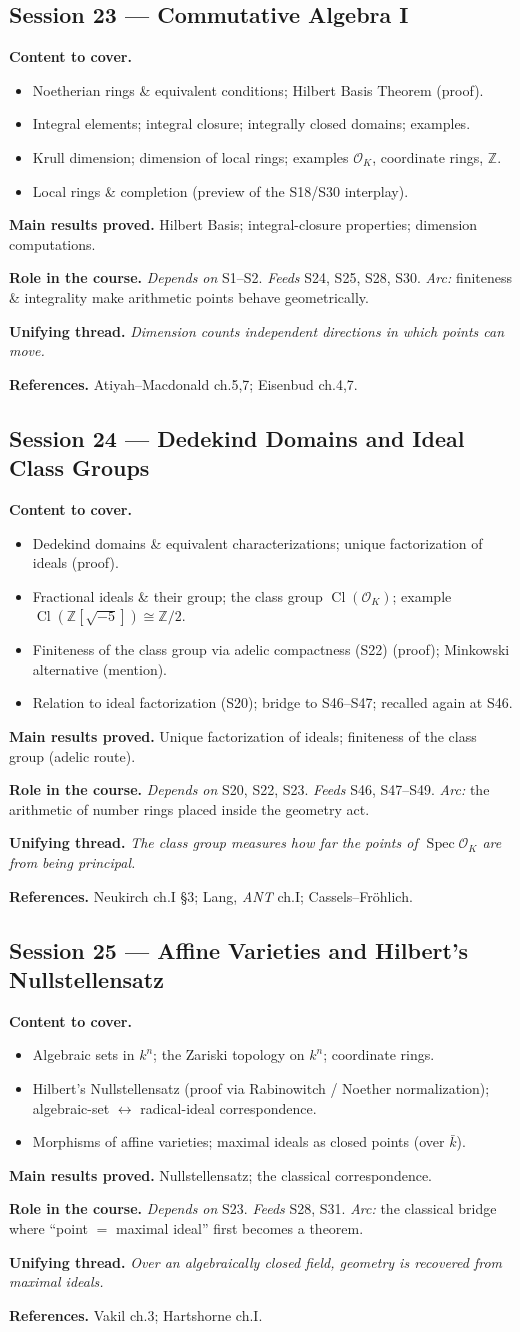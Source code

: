 \documentclass[11pt,a4paper]{article}
\newcommand{\sess}[2]{\subsection[#1. #2]{Session #1 --- #2}}
\newcommand{\chead}{\par\smallskip\noindent\textbf{Content to cover.}}
\newcommand{\proved}[1]{\par\smallskip\noindent\textbf{Main results proved.} #1}
\newcommand{\role}[1]{\par\smallskip\noindent\textbf{Role in the course.} #1}
\newcommand{\thread}[1]{\par\smallskip\noindent\textbf{Unifying thread.} \textit{#1}}
\newcommand{\srefs}[1]{\par\smallskip\noindent\textbf{References.} #1}
\newcommand{\Z}{\mathbb{Z}}
\newcommand{\Spec}{\operatorname{Spec}}
\newcommand{\Cl}{\operatorname{Cl}}
\begin{document}
	\sess{23}{Commutative Algebra I}
	\chead
	\begin{itemize}
		\item Noetherian rings \& equivalent conditions; Hilbert Basis Theorem (proof).
		\item Integral elements; integral closure; integrally closed domains; examples.
		\item Krull dimension; dimension of local rings; examples $\mathcal O_K$, coordinate rings, $\Z$.
		\item Local rings \& completion (preview of the S18/S30 interplay).
	\end{itemize}
	\proved{Hilbert Basis; integral-closure properties; dimension computations.}
	\role{\emph{Depends on} S1--S2. \emph{Feeds} S24, S25, S28, S30. \emph{Arc:} finiteness \& integrality make arithmetic points behave geometrically.}
	\thread{Dimension counts independent directions in which points can move.}
	\srefs{Atiyah--Macdonald ch.5,7; Eisenbud ch.4,7.}
	
	\sess{24}{Dedekind Domains and Ideal Class Groups}
	\chead
	\begin{itemize}
		\item Dedekind domains \& equivalent characterizations; unique factorization of ideals (proof).
		\item Fractional ideals \& their group; the class group $\Cl(\mathcal O_K)$; example $\Cl(\Z[\sqrt{-5}])\cong\Z/2$.
		\item Finiteness of the class group via adelic compactness (S22) (proof); Minkowski alternative (mention).
		\item Relation to ideal factorization (S20); bridge to S46--S47; recalled again at S46.
	\end{itemize}
	\proved{Unique factorization of ideals; finiteness of the class group (adelic route).}
	\role{\emph{Depends on} S20, S22, S23. \emph{Feeds} S46, S47--S49. \emph{Arc:} the arithmetic of number rings placed inside the geometry act.}
	\thread{The class group measures how far the points of $\Spec\mathcal O_K$ are from being principal.}
	\srefs{Neukirch ch.I \S3; Lang, \emph{ANT} ch.I; Cassels--Fr\"ohlich.}
	
	\sess{25}{Affine Varieties and Hilbert's Nullstellensatz}
	\chead
	\begin{itemize}
		\item Algebraic sets in $k^n$; the Zariski topology on $k^n$; coordinate rings.
		\item Hilbert's Nullstellensatz (proof via Rabinowitch / Noether normalization); algebraic-set $\leftrightarrow$ radical-ideal correspondence.
		\item Morphisms of affine varieties; maximal ideals as closed points (over $\bar k$).
	\end{itemize}
	\proved{Nullstellensatz; the classical correspondence.}
	\role{\emph{Depends on} S23. \emph{Feeds} S28, S31. \emph{Arc:} the classical bridge where ``point $=$ maximal ideal'' first becomes a theorem.}
	\thread{Over an algebraically closed field, geometry is recovered from maximal ideals.}
	\srefs{Vakil ch.3; Hartshorne ch.I.}
	
\end{document}
